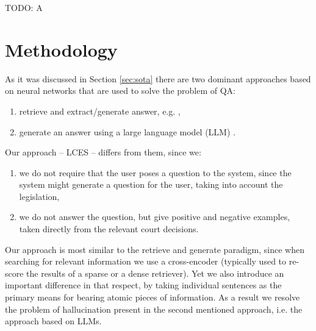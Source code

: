 \documentclass{IOS-Book-Article}
\begin{document}
TODO: A

\section{Methodology}

As it was discussed in Section \ref{sec:sota} there are two dominant approaches 
based on neural networks that are used to solve the problem of QA:
\begin{enumerate}
  \item retrieve and extract/generate answer, e.g. \cite{}, %
  \item generate an answer using a large language model (LLM) \cite{}. %
\end{enumerate}

Our approach -- LCES -- differs from them, since we:
\begin{enumerate}
  \item we do not require that the user poses a question to the system, since the system might generate a question for the user,
    taking into account the legislation,
  \item we do not answer the question, but give positive and negative examples, taken directly from the relevant court decisions.
\end{enumerate}
Our approach is most similar to the retrieve and generate paradigm, since when searching for relevant information we use
a cross-encoder (typically used to re-score the results of a sparse or a dense retriever). Yet we also introduce an important
difference in that respect, by taking individual sentences as the primary means for bearing atomic pieces of information.  
As a result we resolve the problem of hallucination present in the second mentioned approach, i.e. the approach based on LLMs.
\end{document}
